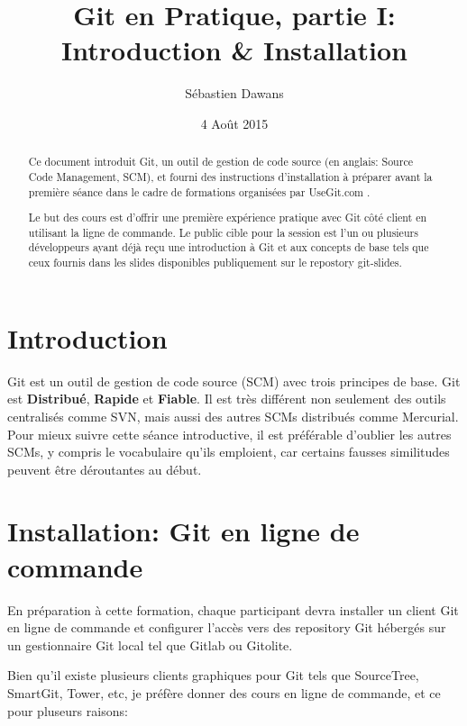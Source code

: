 \documentclass[a4paper]{../../common/tufte-latex/tufte-handout}
\title{Git en Pratique, partie I: Introduction \& Installation}
\author{S\'ebastien Dawans}
\date{4 Ao\^ut 2015} %
\begin{document}
\maketitle%

\begin{abstract}
\noindent
Ce document introduit Git, un outil de gestion de code source (en anglais: Source Code Management, SCM), et fourni des instructions d'installation à préparer avant la première séance dans le cadre de formations organisées par UseGit.com .

Le but des cours est d'offrir une première expérience pratique avec Git côté client en utilisant la ligne de commande. 
Le public cible pour la session est l'un ou plusieurs développeurs ayant déjà reçu une introduction à Git et aux concepts de base tels que ceux fournis dans les slides disponibles publiquement sur le repostory git-slides. 
\end{abstract}


\section{Introduction}\label{sec:intro}

Git est un outil de gestion de code source (SCM) avec trois principes de base.
Git est \textbf{Distribué}, \textbf{Rapide} et \textbf{Fiable}.
Il est très différent non seulement des outils centralisés comme SVN, mais aussi des autres SCMs distribués comme Mercurial.
Pour mieux suivre cette séance introductive, il est préférable d'oublier les autres SCMs, y compris le vocabulaire qu'ils emploient, car certains fausses similitudes peuvent être déroutantes au début.

\section{Installation: Git en ligne de commande}

En préparation à cette formation, chaque participant devra installer un client Git en ligne de commande et configurer l'accès vers des repository Git hébergés sur un gestionnaire Git local tel que Gitlab ou Gitolite.

Bien qu'il existe plusieurs clients graphiques pour Git tels que SourceTree, SmartGit, Tower, etc, je préfère donner des cours en ligne de commande, et ce pour pluseurs raisons:
\end{document}
